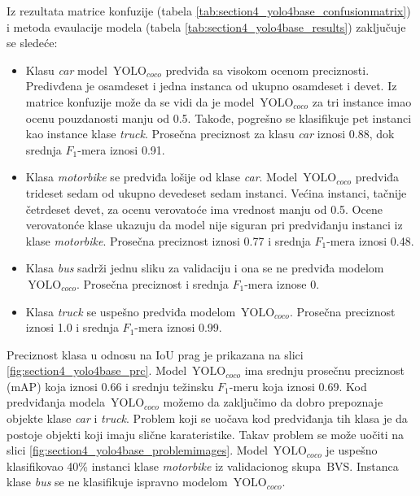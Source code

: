 \documentclass[12pt,oneside]{memoir}
\newcommand{\yolo}{\ensuremath{\,\textrm{YOLO}}}
\newcommand{\bvs}{\ensuremath{\,\textrm{BVS}}}
\begin{document}
Iz rezultata matrice konfuzije (tabela \ref{tab:section4_yolo4base_confusionmatrix}) i metoda evaulacije modela (tabela \ref{tab:section4_yolo4base_results}) zaključuje se sledeće:
\begin{itemize}
    \item Klasu \textit{car} model $\yolo_{coco}$ predviđa sa visokom ocenom preciznosti. Predivđena je osamdeset i jedna instanca od ukupno osamdeset i devet. Iz matrice konfuzije može da se vidi da je model $\yolo_{coco}$ za tri instance imao ocenu pouzdanosti manju od 0.5. Takođe, pogrešno se klasifikuje pet instanci kao instance klase \textit{truck}. Prosečna preciznost za klasu \textit{car} iznosi 0.88, dok srednja $F_1$-mera iznosi 0.91.
    \item Klasa \textit{motorbike} se predviđa lošije od klase \textit{car}. Model $\yolo_{coco}$ predviđa trideset sedam od ukupno devedeset sedam instanci. Većina instanci, tačnije četrdeset devet, za ocenu verovatoće ima vrednost manju od 0.5. Ocene verovatonće klase ukazuju da model nije siguran pri predviđanju instanci iz klase \textit{motorbike}. Prosečna preciznost iznosi 0.77 i srednja $F_1$-mera iznosi 0.48.
    \item Klasa \textit{bus} sadrži jednu sliku za validaciju i ona se ne predviđa modelom $\yolo_{coco}$. Prosečna preciznost i srednja $F_1$-mera iznose 0.
    \item Klasa \textit{truck} se uspešno predviđa modelom $\yolo_{coco}$. Prosečna preciznost iznosi 1.0 i srednja $F_1$-mera iznosi 0.99.
\end{itemize}

Preciznost klasa u odnosu na IoU prag je prikazana na slici \ref{fig:section4_yolo4base_prc}. Model $\yolo_{coco}$ ima srednju prosečnu preciznost (mAP) koja iznosi 0.66 i srednju težinsku $F_1$-meru koja iznosi 0.69. Kod predviđanja modela $\yolo_{coco}$ možemo da zaključimo da dobro prepoznaje objekte klase \textit{car} i \textit{truck}. Problem koji se uočava kod predviđanja tih klasa je da postoje objekti koji imaju slične karateristike. Takav problem se može uočiti na slici \ref{fig:section4_yolo4base_problemimages}. Model $\yolo_{coco}$ je uspešno klasifikovao 40\% instanci klase \textit{motorbike} iz validacionog skupa \bvs{}. Instanca klase \textit{bus} se ne klasifikuje ispravno modelom  $\yolo_{coco}$.

\end{document}
